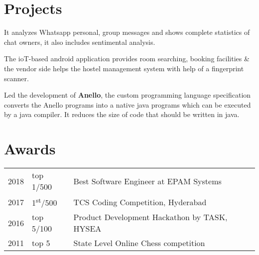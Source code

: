 \documentclass[]{kk-resume-openfont}
\begin{document}
\begin{minipage}[t]{0.66\textwidth}

\section{Projects}
It analyzes Whatsapp personal, group messages and shows complete statistics of chat owners, it also includes sentimental analysis.
\sectionsep

The ioT-based android application provides room searching, booking facilities \& the vendor side helps the hostel management system with help of a fingerprint scanner.
\sectionsep

Led the development of \textbf{Anello}, the custom programming language specification converts the Anello programs into a native java programs which can be executed by a java compiler. It reduces the size of code that should be written in java.
\sectionsep


\section{Awards} 
\begin{tabular}{rll}
2018	     & top 1/500  & Best Software Engineer at EPAM Systems\\
2017	     & 1\textsuperscript{st}/500  & TCS Coding Competition, Hyderabad\\ 
2016	     & top 5/100  & Product Development Hackathon by TASK, HYSEA \\
2011     & top 5 & State Level Online Chess competition \\
\end{tabular}
\sectionsep
\end{minipage} 
\end{document}
